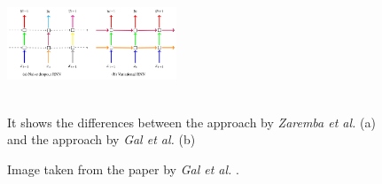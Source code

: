 \documentclass[a4paper]{article}
\begin{document}
\begin{figure}
    \centering     
    \includegraphics[width=0.45\textwidth]{naive-variational scheme.png}     
    \caption{Image taken from the paper by \textit{Gal et al.} .\cite{gal-dropout}}
    \\
    It shows the differences between the approach by \textit{Zaremba et al.} (a) \cite{zaremba-rnn} and the approach by \textit{Gal et al.} (b) \cite{gal-dropout}
\label{fig:naive-variational}
\end{figure}
\end{document}
